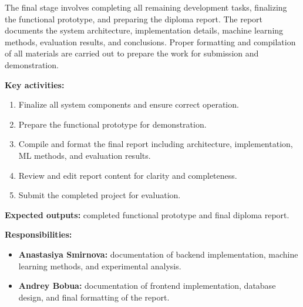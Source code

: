 \documentclass[a4paper,12pt]{extarticle}
\begin{document}
The final stage involves completing all remaining development tasks, finalizing the functional prototype, and preparing the diploma report. The report documents the system architecture, implementation details, machine learning methods, evaluation results, and conclusions. Proper formatting and compilation of all materials are carried out to prepare the work for submission and demonstration.

\textbf{Key activities:}
\begin{enumerate}
    \item Finalize all system components and ensure correct operation.
    \item Prepare the functional prototype for demonstration.
    \item Compile and format the final report including architecture, implementation, ML methods, and evaluation results.
    \item Review and edit report content for clarity and completeness.
    \item Submit the completed project for evaluation.
\end{enumerate}

\textbf{Expected outputs:} completed functional prototype and final diploma report.

\textbf{Responsibilities:}
\begin{itemize}
    \item \textbf{Anastasiya Smirnova:} documentation of backend implementation, machine learning methods, and experimental analysis.
    \item \textbf{Andrey Bobua:} documentation of frontend implementation, database design, and final formatting of the report.
\end{itemize}



\newpage
\printbibliography
{}
\end{document}
